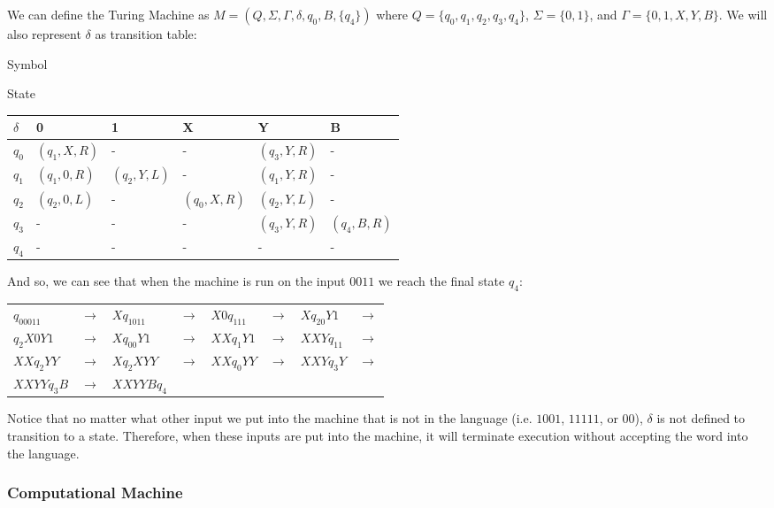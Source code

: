 \documentclass[12pt]{article}
\begin{document}
We can define the Turing Machine as $M=(Q,\Sigma, \Gamma, \delta, q_0, B, \{q_4\})$ where $Q = \{q_0, q_1, q_2, q_3, q_4 \}$, $\Sigma = \{0,1\}$, and $\Gamma = \{0,1,X,Y,B\}$. We will also represent $\delta$ as transition table:

\begin{center}
Symbol

State
\begin{tabular}{ l | l   l   l   l   l }

$\delta$	& 0				& 1				& X				& Y				& B			\\ \hline
$q_0$ 	& $(q_1,X,R)$		& -				& -				& $(q_3,Y,R)$		& -			\\ 
$q_1$	& $(q_1,0,R)$		& $(q_2,Y,L)$		& -				& $(q_1,Y,R)$		& -			\\
$q_2$	& $(q_2,0,L)$		& -				&$ (q_0,X,R) $		& $(q_2,Y,L)$		& -			\\
$q_3$	& -				& -				& -				& $(q_3,Y,R)$		& $(q_4,B,R) $	\\
$q_4$	& -				& -				& -				& -				& -			\\ 
    
\end{tabular}
\end{center}

And so, we can see that when the machine is run on the input $0011$ we reach the final state $q_4$:

\begin{tabular}{l l l l l l l l}

$q_00011$	& $\to$	& $Xq_1011$		&$\to$	& $X0q_111$		& $\to$	& $Xq_20Y1$		&$\to$	\\
$q_2X0Y1$	& $\to$	& $Xq_00Y1$		&$\to$	& $XXq_1Y1$		& $\to$	& $ XXYq_11$		&$\to$	\\
$XXq_2YY$	& $\to$	& $Xq_2XYY$		&$\to$	& $XXq_0YY$		& $\to$	& $ XXYq_3Y$		&$\to$	\\
$XXYYq_3B$	& $\to$	& $XXYYBq_4$	&		&				&		&				&		\\

    
\end{tabular}

\noindent Notice that no matter what other input we put into the machine that is not in the language (i.e. $1001$, $11111$, or $00$), $\delta$ is not defined to transition to a state. Therefore, when these inputs are put into the machine, it will terminate execution without accepting the word into the language.

\subsubsection*{Computational Machine}
\end{document}
